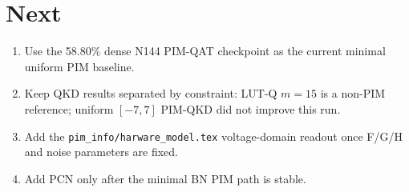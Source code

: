 \documentclass[10pt]{article}
\begin{document}
\section*{Next}

\begin{enumerate}
  \item Use the 58.80\% dense N144 PIM-QAT checkpoint as the current minimal uniform PIM baseline.
  \item Keep QKD results separated by constraint: LUT-Q $m=15$ is a non-PIM reference; uniform $[-7,7]$ PIM-QKD did not improve this run.
  \item Add the \texttt{pim\_info/harware\_model.tex} voltage-domain readout once F/G/H and noise parameters are fixed.
  \item Add PCN only after the minimal BN PIM path is stable.
\end{enumerate}
\end{document}
